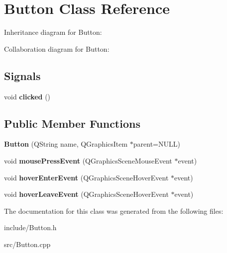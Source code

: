 \hypertarget{classButton}{}\section{Button Class Reference}
\label{classButton}


Inheritance diagram for Button\+:


Collaboration diagram for Button\+:
\subsection*{Signals}
\begin{DoxyCompactItemize}
\item 
\mbox{\label{classButton_a9e7ab4152cb1e7e3beb7f2842f32670c}} 
void {\bfseries clicked} ()
\end{DoxyCompactItemize}
\subsection*{Public Member Functions}
\begin{DoxyCompactItemize}
\item 
\mbox{\label{classButton_a69976e5c00874a3807b642f249c1c776}} 
{\bfseries Button} (Q\+String name, Q\+Graphics\+Item $\ast$parent=N\+U\+LL)
\item 
\mbox{\label{classButton_a17d8eb0c904605b223bbc00c75655315}} 
void {\bfseries mouse\+Press\+Event} (Q\+Graphics\+Scene\+Mouse\+Event $\ast$event)
\item 
\mbox{\label{classButton_a633a9684818bc5d300a622a00064f09c}} 
void {\bfseries hover\+Enter\+Event} (Q\+Graphics\+Scene\+Hover\+Event $\ast$event)
\item 
\mbox{\label{classButton_a1689a97690d9469ce8350d24db0d7485}} 
void {\bfseries hover\+Leave\+Event} (Q\+Graphics\+Scene\+Hover\+Event $\ast$event)
\end{DoxyCompactItemize}


The documentation for this class was generated from the following files\+:\begin{DoxyCompactItemize}
\item 
include/Button.\+h\item 
src/Button.\+cpp\end{DoxyCompactItemize}
